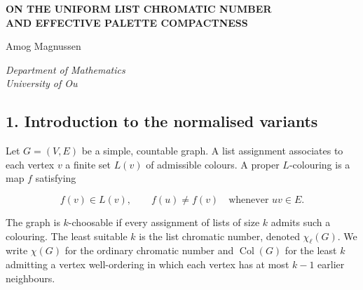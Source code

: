 \documentclass[11pt,letterpaper]{article}
\let\oldsubsection\subsection
\renewcommand{\subsection}{\Needspace{8\baselineskip}\oldsubsection}
\begin{document}
\thispagestyle{firstpage}
\begin{center}
{\Large\bfseries ON THE UNIFORM LIST CHROMATIC NUMBER\\[4pt]
AND EFFECTIVE PALETTE COMPACTNESS\par}
\vspace{16pt}
{\large Amog Magnussen\par}
\vspace{5pt}
{\itshape Department of Mathematics\\University of Ou\par}
\end{center}
\vspace{10pt}
\begin{abstract}
We introduce a uniform treatment of list colourability in which the available colours are regarded as finite-dimensional fibres over a graph. A local palette-trivialisation lemma shows that ordinary and list colourability coincide after a suitable change of chromatic coordinates. An effective compactness argument then removes the distinction between a colouring and a computable colouring. Finally, we identify the greedy colouring number with the rank of a predecessor operator, obtaining a spectral explanation for the disappearance of the usual gaps between these invariants. Applications include a four-colour theorem for list assignments and a polynomial-time colouring procedure with compact preprocessing. The proofs are constructive except where compactness makes a construction unnecessary.

\end{abstract}
\vspace{5pt}
\subsection{1. Introduction to the normalised variants}\label{introduction-to-the-normalised-variants}

Let \(G=(V,E)\) be a simple, countable graph. A list assignment associates to each vertex \(v\) a finite set \(L(v)\) of admissible colours. A proper \(L\)-colouring is a map \(f\) satisfying

\[
f(v)\in L(v),\qquad f(u)\ne f(v)\quad\text{whenever }uv\in E.
\]

The graph is \(k\)-choosable if every assignment of lists of size \(k\) admits such a colouring. The least suitable \(k\) is the list chromatic number, denoted \(\chi_\ell(G)\). We write \(\chi(G)\) for the ordinary chromatic number and \(\operatorname{Col}(G)\) for the least \(k\) admitting a vertex well-ordering in which each vertex has at most \(k-1\) earlier neighbours.
\end{document}
